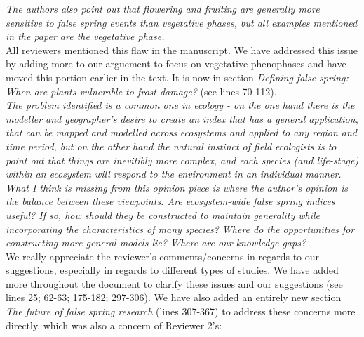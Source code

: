 \documentclass[11pt,a4paper]{article}
\begin{document}
\textit{The authors also point out that flowering and fruiting are generally more sensitive to false spring events than vegetative phases, but all examples mentioned in the paper are the vegetative phase.} \\

All reviewers mentioned this flaw in the manuscript. We have addressed this issue by adding more to our arguement to focus on vegetative phenophases and have moved this portion earlier in the text. It is now in section \textit{Defining false spring: When are plants vulnerable to frost damage?} (see lines 70-112). \\

\textit{The problem identified is a common one in ecology - on the one hand there is the modeller and geographer's desire to create an index that has a general application, that can be mapped and modelled across ecosystems and applied to any region and time period, but on the other hand the natural instinct of field ecologists is to point out that things are inevitibly more complex, and each species (and life-stage) within an ecosystem will respond to the environment in an individual manner. What I think is missing from this opinion piece is where the author's opinion is the balance between these viewpoints.  Are ecosystem-wide false spring indices useful?  If so, how should they be constructed to maintain generality while incorporating the characteristics of many species?  Where do the opportunities for constructing more general models lie? Where are our knowledge gaps?} \\

We really appreciate the reviewer's comments/concerns in regards to our suggestions, especially in regards to different types of studies. We have added more throughout the document to clarify these issues and our suggestions (see lines 25; 62-63; 175-182; 297-306). We have also added an entirely new section \textit{The future of false spring research} (lines 307-367) to address these concerns more directly, which was also a concern of Reviewer 2's: \\
\end{document}
